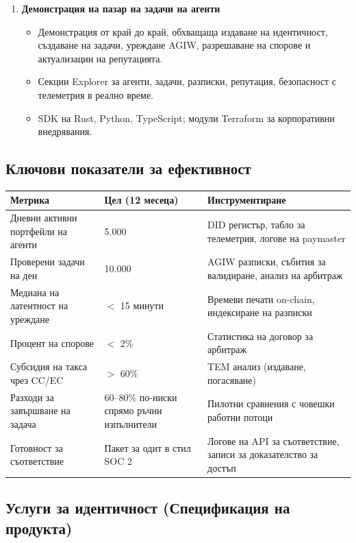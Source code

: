 \documentclass[11pt]{article}
\begin{document}
\begin{enumerate}[label=\textbf{D\arabic*.}, leftmargin=*]
  \item \textbf{Демонстрация на пазар на задачи на агенти}
  \begin{itemize}[noitemsep]
    \item Демонстрация от край до край, обхващаща издаване на идентичност, създаване на задачи, уреждане AGIW, разрешаване на спорове и актуализации на репутацията.
    \item Секции Explorer за агенти, задачи, разписки, репутация, безопасност с телеметрия в реално време.
    \item SDK на Rust, Python, TypeScript; модули Terraform за корпоративни внедрявания.
  \end{itemize}
\end{enumerate}

\subsection{Ключови показатели за ефективност}
\begin{longtable}{@{}p{}p{}p{}@{}}
\toprule
\textbf{Метрика} & \textbf{Цел (12 месеца)} & \textbf{Инструментиране} \\\midrule
Дневни активни портфейли на агенти & 5.000 & DID регистър, табло за телеметрия, логове на paymaster \\
Проверени задачи на ден & 10.000 & AGIW разписки, събития за валидиране, анализ на арбитраж \\
Медиана на латентност на уреждане & $<$ 15 минути & Времеви печати on-chain, индексиране на разписки \\
Процент на спорове & $<$ 2\% & Статистика на договор за арбитраж \\
Субсидия на такса чрез CC/EC & $>$ 60\% & TEM анализ (издаване, погасяване) \\
Разходи за завършване на задача & 60--80\% по-ниски спрямо ръчни изпълнители & Пилотни сравнения с човешки работни потоци \\
Готовност за съответствие & Пакет за одит в стил SOC 2 & Логове на API за съответствие, записи за доказателство за достъп \\
\bottomrule
\end{longtable}

\subsection{Услуги за идентичност (Спецификация на продукта)}
\label{sec:identity-spec}
\end{document}

